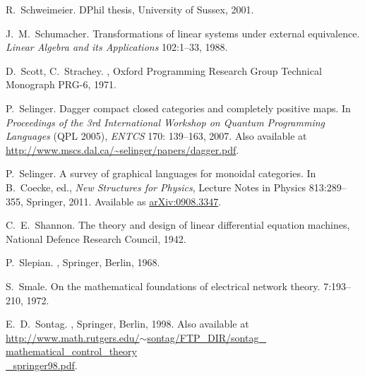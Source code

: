 \begin{thebibliography}{RSW00}
    R.\ Schweimeier.
    \newblock DPhil thesis, University of Sussex, 2001.

    J.\ M.\ Schumacher.
    \newblock Transformations of linear systems under
    external equivalence.
    \newblock \emph{Linear Algebra and its Applications} 102:1--33, 1988.

    D.\ Scott, C.\ Strachey.
    ,
    Oxford Programming Research Group Technical Monograph PRG-6, 1971.


    P.\ Selinger.
    \newblock Dagger compact closed categories and completely
    positive maps.
    \newblock In {\sl Proceedings of the 3rd International Workshop on
    Quantum Programming Languages} (QPL 2005), {\sl ENTCS} { 170}:
    139--163, 2007.
    \newblock Also available at
    \href{http://www.mscs.dal.ca/~selinger/papers/dagger.pdf}{http://www.mscs.dal.ca/\~{}selinger/papers/dagger.pdf}.

    P.\ Selinger.
    \newblock A survey of graphical languages
    for monoidal categories.
    \newblock In B.\ Coecke, ed., \emph{New Structures for
    Physics}, Lecture Notes in Physics 813:289--355, Springer, 2011.
    \newblock Available
    as \href{http://arxiv.org/abs/0908.3347}{arXiv:0908.3347}.

    C.\ E.\ Shannon.
    \newblock The theory and design of linear differential equation machines, National Defence Research Council, 1942.


    P.\ Slepian.
    , Springer, Berlin, 1968. 

    S.\ Smale.
    \newblock On the mathematical foundations of electrical
    network theory.
     { 7}:193--210, 1972. 

    E.\ D.\ Sontag.
    , Springer, Berlin, 1998. 
    \newblock Also available at \\
    \href{http://www.math.rutgers.edu/~sontag/FTP_DIR/sontag_mathematical_control_theory_springer98.pdf}
    {http://www.math.rutgers.edu/$\sim$sontag/FTP\_DIR/sontag\_ mathematical\_control\_theory\\\_springer98.pdf}.


\end{thebibliography}
